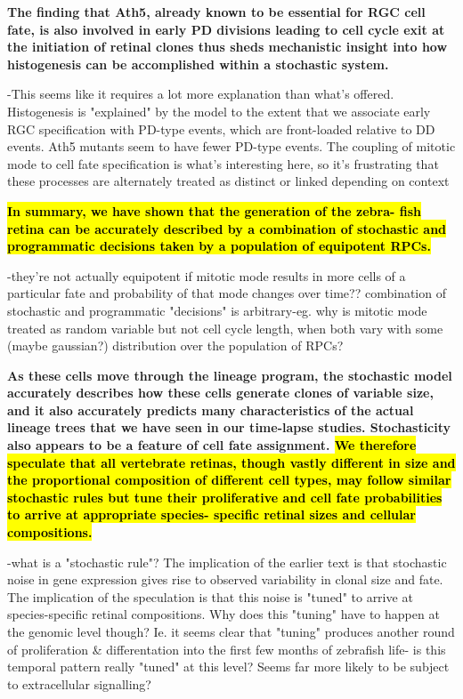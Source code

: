 \documentclass{ut-thesis}
\begin{document}
\bigskip

\textbf{
 The
finding that Ath5, already known to be essential for RGC cell
fate, is also involved in early PD divisions leading to cell cycle
exit at the initiation of retinal clones thus sheds mechanistic
insight into how histogenesis can be accomplished within
a stochastic system.}

\bigskip

-This seems like it requires a lot more explanation than what's offered. Histogenesis is "explained" by the model to the extent that we associate early RGC specification with PD-type events, which are front-loaded relative to DD events. Ath5 mutants seem to have fewer PD-type events. The coupling of mitotic mode to cell fate specification is what's interesting here, so it's frustrating that these processes are alternately treated as distinct or linked depending on context

\bigskip

\textbf{\hl{
In summary, we have shown that the generation of the zebra-
fish retina can be accurately described by a combination of
stochastic and programmatic decisions taken by a population
of equipotent RPCs.}}

\bigskip

-they're not actually equipotent if mitotic mode results in more cells of a particular fate and probability of that mode changes over time?? combination of stochastic and programmatic "decisions" is arbitrary-eg. why is mitotic mode treated as random variable but not cell cycle length, when both vary with some (maybe gaussian?) distribution over the population of RPCs?

\bigskip

\textbf{
 As these cells move through the lineage
program, the stochastic model accurately describes how these
cells generate clones of variable size, and it also accurately
predicts many characteristics of the actual lineage trees that
we have seen in our time-lapse studies. Stochasticity also
appears to be a feature of cell fate assignment. \hl{We therefore
speculate that all vertebrate retinas, though vastly different in
size and the proportional composition of different cell types,
may follow similar stochastic rules but tune their proliferative
and cell fate probabilities to arrive at appropriate species-
specific retinal sizes and cellular compositions.}}

\bigskip

-what is a "stochastic rule"? The implication of the earlier text is that stochastic noise in gene expression gives rise to observed variability in clonal size and fate. The implication of the speculation is that this noise is "tuned" to arrive at species-specific retinal compositions. Why does this "tuning" have to happen at the genomic level though? Ie. it seems clear that "tuning" produces another round of proliferation & differentation into the first few months of zebrafish life- is this temporal pattern really "tuned" at this level? Seems far more likely to be subject to extracellular signalling?
\end{document}
